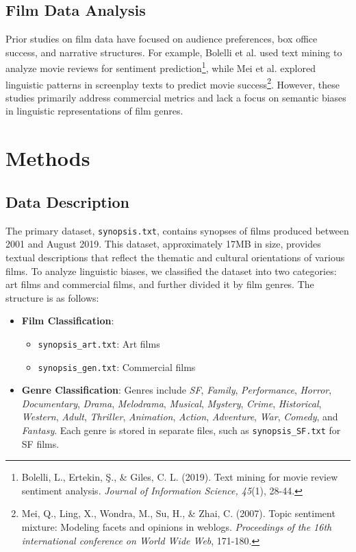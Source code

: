 \documentclass[conference]{IEEEtran}
\begin{document}
\subsection{Film Data Analysis}
Prior studies on film data have focused on audience preferences, box office success, and narrative structures. For example, Bolelli et al. used text mining to analyze movie reviews for sentiment prediction\footnote{Bolelli, L., Ertekin, Ş., \& Giles, C. L. (2019). Text mining for movie review sentiment analysis. \textit{Journal of Information Science, 45}(1), 28-44.}, while Mei et al. explored linguistic patterns in screenplay texts to predict movie success\footnote{Mei, Q., Ling, X., Wondra, M., Su, H., \& Zhai, C. (2007). Topic sentiment mixture: Modeling facets and opinions in weblogs. \textit{Proceedings of the 16th international conference on World Wide Web}, 171-180.}. However, these studies primarily address commercial metrics and lack a focus on semantic biases in linguistic representations of film genres.

\section{Methods}

\subsection{Data Description}
The primary dataset, \texttt{synopsis.txt}, contains synopses of films produced between 2001 and August 2019. This dataset, approximately 17MB in size, provides textual descriptions that reflect the thematic and cultural orientations of various films. To analyze linguistic biases, we classified the dataset into two categories: art films and commercial films, and further divided it by film genres. The structure is as follows:

\begin{itemize}
    \item \textbf{Film Classification}:
    \begin{itemize}
        \item \texttt{synopsis\_art.txt}: Art films
        \item \texttt{synopsis\_gen.txt}: Commercial films
    \end{itemize}
    \item \textbf{Genre Classification}:
    Genres include \textit{SF}, \textit{Family}, \textit{Performance}, \textit{Horror}, \textit{Documentary}, \textit{Drama}, \textit{Melodrama}, \textit{Musical}, \textit{Mystery}, \textit{Crime}, \textit{Historical}, \textit{Western}, \textit{Adult}, \textit{Thriller}, \textit{Animation}, \textit{Action}, \textit{Adventure}, \textit{War}, \textit{Comedy}, and \textit{Fantasy}. Each genre is stored in separate files, such as \texttt{synopsis\_SF.txt} for SF films.
\end{itemize}
\end{document}
